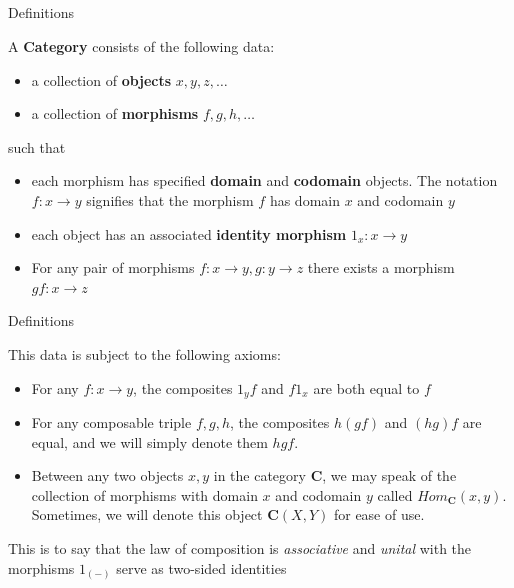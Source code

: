 \documentclass[tikz]{beamer}
\theoremstyle{definition}
\begin{document}
\subsection{}
\begin{frame}{Definitions}
\begin{definition}[Category]
A \textbf{Category} consists of the following data:
\begin{itemize}
    \item a collection of \textbf{objects} $x, y, z, \ldots$
    \item a collection of \textbf{morphisms} $f, g, h, \ldots$
\end{itemize}{}
 such that
\begin{itemize}
    \item each morphism has specified \textbf{domain} and \textbf{codomain} objects. The notation $f: x \to y$ signifies that the morphism $f$ has domain $x$ and codomain $y$
    \item each object has an associated \textbf{identity morphism} $1_x : x \to y$
    \item For any pair of morphisms $f: x \to y, g: y \to z$ there exists a morphism $gf: x \to z$
\end{itemize}{}

\end{definition}
\end{frame}
\begin{frame}{Definitions}

This data is subject to the following axioms:

\begin{itemize}
    \item For any $f: x \to y$, the composites $1_y f$ and  $f 1_x$ are both equal to $f$
    \item For any composable triple $f, g, h$, the composites $h(gf)$ and $(hg)f$ are equal, and we will simply denote them $hgf$.
    \item Between any two objects $x, y$ in the category $\mathbf{C}$, we may speak of the collection of morphisms with domain $x$ and codomain $y$ called $Hom_{\mathbf{C}}(x, y)$. Sometimes, we will denote this object $\mathbf{C}(X, Y)$ for ease of use.
\end{itemize}{}

This is to say that the law of composition is \textit{associative} and \textit{unital} with the morphisms $1_{(-)}$  serve as two-sided identities
\end{frame}
\end{document}
